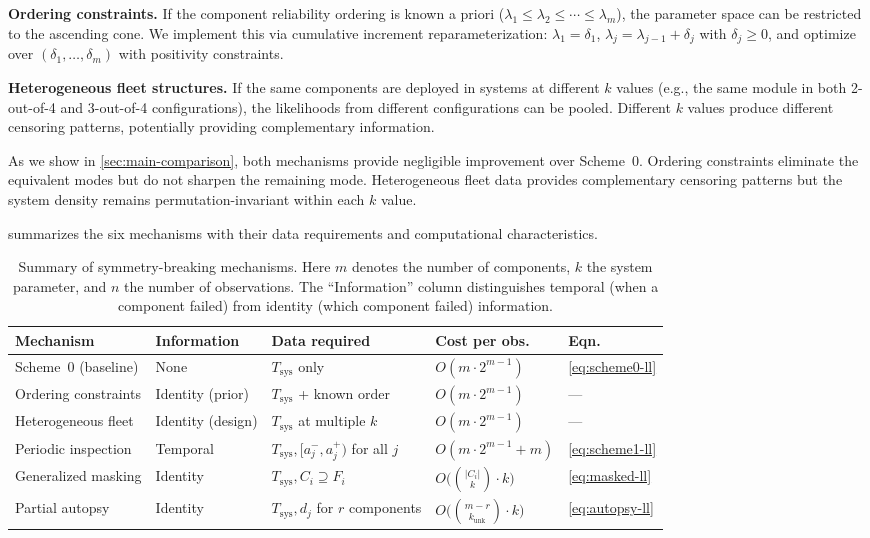 \documentclass[12pt]{article}
\newcommand{\Tsys}{T_{\mathrm{sys}}}
\begin{document}
\textbf{Ordering constraints.}
If the component reliability ordering is known a priori
($\lambda_1 \leq \lambda_2 \leq \cdots \leq \lambda_m$), the parameter
space can be restricted to the ascending cone.  We implement this via
cumulative increment reparameterization: $\lambda_1 = \delta_1$,
$\lambda_j = \lambda_{j-1} + \delta_j$ with $\delta_j \geq 0$, and
optimize over $(\delta_1, \ldots, \delta_m)$ with positivity constraints.

\textbf{Heterogeneous fleet structures.}
If the same components are deployed in systems at different $k$ values
(e.g., the same module in both 2-out-of-4 and 3-out-of-4
configurations), the likelihoods from different configurations can be
pooled.  Different $k$ values produce different censoring patterns,
potentially providing complementary information.

As we show in \cref{sec:main-comparison}, both mechanisms provide
negligible improvement over Scheme~0.  Ordering constraints eliminate
the equivalent modes but do not sharpen the remaining mode.
Heterogeneous fleet data provides complementary censoring patterns but
the system density remains permutation-invariant within each $k$ value.

 summarizes the six mechanisms with their data
requirements and computational characteristics.

\begin{table}[t]
\centering
\caption{Summary of symmetry-breaking mechanisms.  Here $m$ denotes the
  number of components, $k$ the system parameter, and $n$ the number of
  observations.  The ``Information'' column distinguishes temporal
  (when a component failed) from identity (which component failed)
  information.}\label{tab:mechanisms}
\small
\begin{tabular}{@{}lllll@{}}
\toprule
Mechanism & Information & Data required & Cost per obs.\ &
  Eqn.\ \\
\midrule
Scheme~0 (baseline) & None & $\Tsys$ only &
  $O(m \cdot 2^{m-1})$ & \eqref{eq:scheme0-ll} \\
Ordering constraints & Identity (prior) & $\Tsys$ + known order &
  $O(m \cdot 2^{m-1})$ & --- \\
Heterogeneous fleet & Identity (design) & $\Tsys$ at multiple $k$ &
  $O(m \cdot 2^{m-1})$ & --- \\
Periodic inspection & Temporal & $\Tsys, [a_j^-,a_j^+)$ for all $j$ &
  $O(m \cdot 2^{m-1} + m)$ & \eqref{eq:scheme1-ll} \\
Generalized masking & Identity & $\Tsys, C_i \supseteq F_i$ &
  $O\bigl(\binom{|C_i|}{k} \cdot k\bigr)$ & \eqref{eq:masked-ll} \\
Partial autopsy & Identity & $\Tsys, d_j$ for $r$ components &
  $O\bigl(\binom{m-r}{k_\text{unk}} \cdot k\bigr)$ &
  \eqref{eq:autopsy-ll} \\
\bottomrule
\end{tabular}
\end{table}
\end{document}

